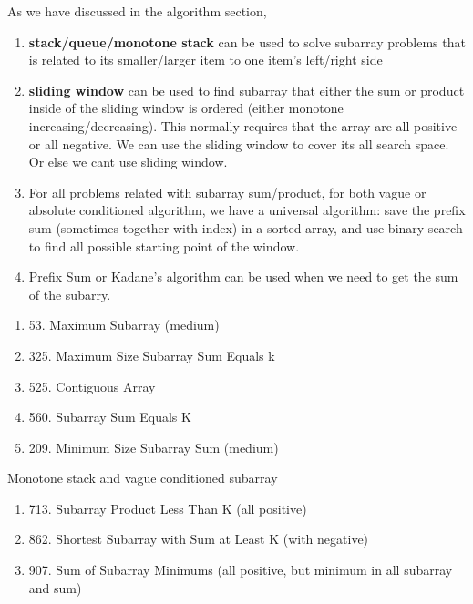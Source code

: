 \documentclass[../main.tex]{subfiles}
\begin{document}
As we have discussed in the algorithm section, 
\begin{enumerate}
    \item \textbf{stack/queue/monotone stack} can be used to solve subarray problems that is related to its smaller/larger item to one item's left/right side
    \item \textbf{sliding window} can be used to find subarray that either the sum or product inside of the sliding window is ordered (either monotone increasing/decreasing). This normally requires that the array are all positive or all negative. We can use the sliding window to cover its all search space. Or else we cant use sliding window. 
    \item For all problems related with subarray sum/product, for both vague or absolute conditioned algorithm, we have a universal algorithm: save the prefix sum (sometimes together with index) in a sorted array, and use binary search to find all possible starting point of the window. 
    \item Prefix Sum or Kadane's algorithm can be used when we need to get the sum of the subarry. 
\end{enumerate}

\begin{enumerate}
    \item 53. Maximum Subarray (medium)
    \item 325. Maximum Size Subarray Sum Equals k
    \item 525. Contiguous Array
    \item 560. Subarray Sum Equals K
    \item 209. Minimum Size Subarray Sum (medium)
\end{enumerate}
Monotone stack and vague conditioned subarray
\begin{enumerate}
    \item 713. Subarray Product Less Than K (all positive)
    \item 862. Shortest Subarray with Sum at Least K (with negative)
    \item 907. Sum of Subarray Minimums (all positive, but minimum in all subarray and sum) 
\end{enumerate}


\end{document}
